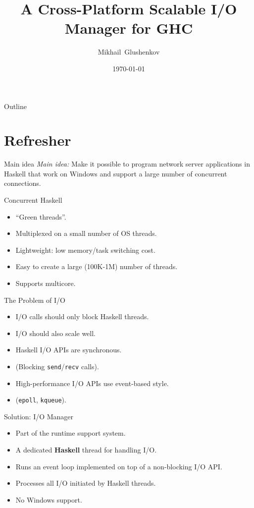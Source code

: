 \documentclass{beamer}
\title{A Cross-Platform Scalable I/O Manager for GHC}
\author{Mikhail~Glushenkov}
\date{\today}
\begin{document}
\begin{frame}
  \titlepage
\end{frame}

\begin{frame}{Outline}
  \tableofcontents
\end{frame}

\section {Refresher}

\begin{frame}{Main idea}
  \emph{Main idea:} Make it possible to program network server applications in
  Haskell that work on Windows and support a large number of concurrent
  connections.
\end{frame}

\begin{frame}{Concurrent Haskell}
  \begin{itemize}
  \item ``Green threads''.
  \item Multiplexed on a small number of OS threads.
  \item Lightweight: low memory/task switching cost.
  \item Easy to create a large (100K-1M) number of threads.
  \item Supports multicore.
  \end{itemize}
\end{frame}

\begin{frame}{The Problem of I/O}
  \begin{itemize}
  \item I/O calls should only block Haskell threads.
  \item I/O should also scale well.
  \item Haskell I/O APIs are synchronous.
  \item (Blocking \texttt{send}/\texttt{recv} calls).
  \item High-performance I/O APIs use event-based style.
  \item (\texttt{epoll}, \texttt{kqueue}).
  \end{itemize}
\end{frame}

\begin{frame}{Solution: I/O Manager}
  \begin{itemize}
  \item Part of the runtime support system.
  \item A dedicated \textbf{Haskell} thread for handling I/O.
  \item Runs an event loop implemented on top of a non-blocking I/O API.
  \item Processes all I/O initiated by Haskell threads.
  \item No Windows support.
  \end{itemize}
\end{frame}
\end{document}
